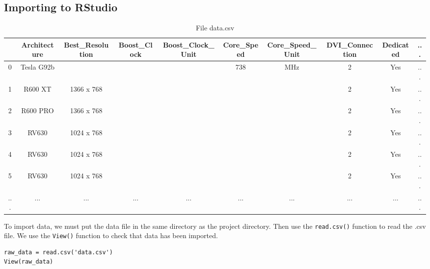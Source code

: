 \documentclass[a4paper]{article}
\begin{document}
\subsection{Importing to RStudio}
\begin{table}[H]
\centering
\begin{adjustbox}{width=\textwidth}
\begin{tabular}{|c|c|c|c|c|c|c|c|c|c|}
\hline
    & Architecture & Best\_Resolution & Boost\_Clock & Boost\_Clock\_Unit & Core\_Speed & Core\_Speed\_Unit & DVI\_Connection & Dedicated & ... \\ \hline
0   & Tesla G92b   &                  &              &                    & 738         & MHz               & 2               & Yes       & ... \\ \hline
1   & R600 XT      & 1366 x 768       &              &                    &             &                   & 2               & Yes       & ... \\ \hline
2   & R600 PRO     & 1366 x 768       &              &                    &             &                   & 2               & Yes       & ... \\ \hline
3   & RV630        & 1024 x 768       &              &                    &             &                   & 2               & Yes       & ... \\ \hline
4   & RV630        & 1024 x 768       &              &                    &             &                   & 2               & Yes       & ... \\ \hline
5   & RV630        & 1024 x 768       &              &                    &             &                   & 2               & Yes       & ... \\ \hline
... & ...          & ...              & ...          & ...                & ...         & ...               & ...             & ...       & ... \\ \hline
\end{tabular}
\end{adjustbox}
\caption*{File data.csv}
\end{table}
To import data, we must put the data file in the same directory as the project directory. Then use the \verb|read.csv()| function to read the .csv file. We use the \verb|View()| function to check that data has been imported.
\begin{mdframed}[leftline=false,rightline=false,backgroundcolor=lightblue!10,nobreak=false]
    \begin{verbatim}
raw_data = read.csv('data.csv')
View(raw_data)
    \end{verbatim}
\end{mdframed}
\end{document}
